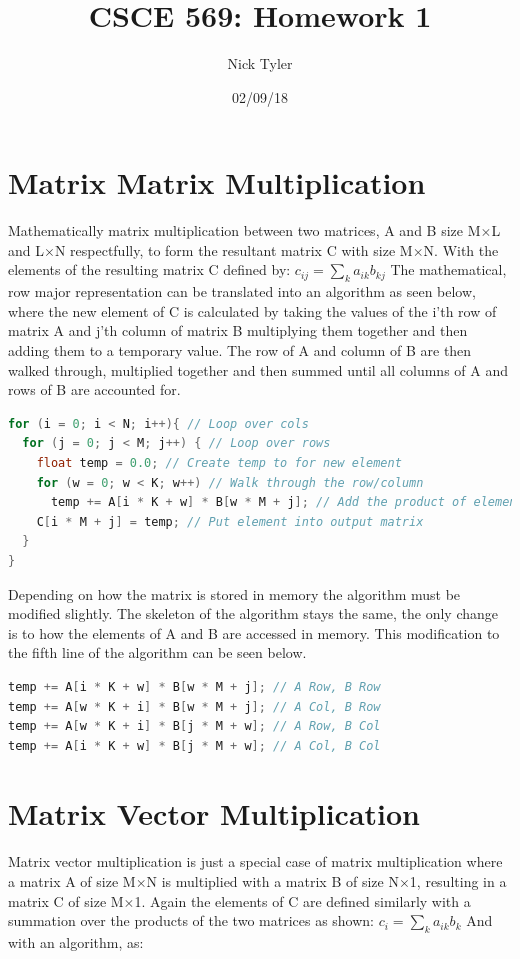 \documentclass[a4paper]{article}
\title{CSCE 569: Homework 1}
\author{Nick Tyler}
\date{02/09/18}
\begin{document}
\maketitle

\section*{Matrix Matrix Multiplication}
Mathematically matrix multiplication between two matrices, A and B size M$\times$L and L$\times$N respectfully, to form the resultant matrix C with size M$\times$N. With the elements of the resulting matrix C defined by: $c_{ij} = \sum_{k} a_{ik}b_{kj}$ 
The mathematical, row major representation can be translated into an algorithm as seen below, where the new element of C is calculated by taking the values of the i'th row of matrix A and j'th column of matrix B multiplying them together and then adding them to a temporary value. The row of A and column of B are then walked through, multiplied together and then summed until all columns of A and rows of B are accounted for.

\begin{lstlisting}[language=C++]
for (i = 0; i < N; i++){ // Loop over cols
  for (j = 0; j < M; j++) { // Loop over rows
    float temp = 0.0; // Create temp to for new element
    for (w = 0; w < K; w++) // Walk through the row/column
      temp += A[i * K + w] * B[w * M + j]; // Add the product of elements
    C[i * M + j] = temp; // Put element into output matrix
  }
}
\end{lstlisting}


Depending on how the matrix is stored in memory the algorithm must be modified slightly. The skeleton of the algorithm stays the same, the only change is to how the elements of A and B are accessed in memory. This modification to the fifth line of the algorithm can be seen below.

\begin{lstlisting}[language=C++]
temp += A[i * K + w] * B[w * M + j]; // A Row, B Row
temp += A[w * K + i] * B[w * M + j]; // A Col, B Row
temp += A[w * K + i] * B[j * M + w]; // A Row, B Col
temp += A[i * K + w] * B[j * M + w]; // A Col, B Col
\end{lstlisting}

\section*{Matrix Vector Multiplication}
Matrix vector multiplication is just a special case of matrix multiplication where a matrix A of size M$\times$N is multiplied with a matrix B of size N$\times$1, resulting in a matrix C of size M$\times$1. Again the elements of C are defined similarly with a summation over the products of the two matrices as shown: $c_{i} = \sum_{k} a_{ik}b_{k}$
And with an algorithm, as:
\end{document}
